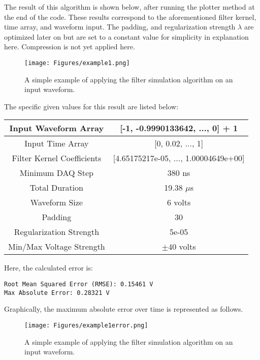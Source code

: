 The result of this algorithm is shown below, after running the plotter method at the end of the code. These results correspond to the aforementioned filter kernel, time array, and waveform input. The padding, and regularization strength $\lambda$ are optimized later on but are set to a constant value for simplicity in explanation here. Compression is not yet applied here.

\begin{figure}[h!]
    \centering
\texttt{[image: Figures/example1.png]}
    \caption{A simple  example of applying the filter simulation algorithm on an input waveform.}
\end{figure} \label{example1}

The specific given values for this result are listed below:

\begin{center}
\begin{tabular}{ | c | c | } 
  \hline
   Input Waveform Array & [-1, -0.9990133642, ..., 0] + 1 \\ 
  \hline
  Input Time Array & [0, 0.02, ..., 1] \\ 
  \hline
  Filter Kernel Coefficients & [4.65175217e-05, ..., 1.00004649e+00] \\ 
  \hline
  Minimum DAQ Step & 380 ns \\ 
  \hline
  Total Duration & 19.38 $\mu$s \\ 
  \hline
  Waveform Size & 6 volts \\ 
  \hline
  Padding & 30 \\ 
  \hline
  Regularization Strength & 5e-05 \\ 
  \hline
  Min/Max Voltage Strength & $\pm 40$ volts \\ 
  \hline
\end{tabular}
\end{center}

Here, the calculated error is:

\begin{verbatim}
Root Mean Squared Error (RMSE): 0.15461 V
Max Absolute Error: 0.28321 V
\end{verbatim}

Graphically, the maximum absolute error over time is represented as follows.

\begin{figure}[h!]
    \centering
\texttt{[image: Figures/example1error.png]}
    \caption{A simple example of applying the filter simulation algorithm on an input waveform.}
\end{figure} \label{example1error}

